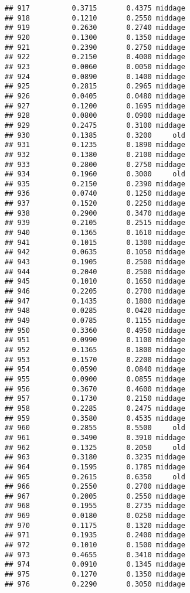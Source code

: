 \documentclass[
]{article}
\begin{document}
\begin{verbatim}
## 917          0.3715       0.4375 middage
## 918          0.1210       0.2550 middage
## 919          0.2630       0.2740 middage
## 920          0.1300       0.1350 middage
## 921          0.2390       0.2750 middage
## 922          0.2150       0.4000 middage
## 923          0.0060       0.0050 middage
## 924          0.0890       0.1400 middage
## 925          0.2815       0.2965 middage
## 926          0.0405       0.0480 middage
## 927          0.1200       0.1695 middage
## 928          0.0800       0.0900 middage
## 929          0.2475       0.3100 middage
## 930          0.1385       0.3200     old
## 931          0.1235       0.1890 middage
## 932          0.1380       0.2100 middage
## 933          0.2800       0.2750 middage
## 934          0.1960       0.3000     old
## 935          0.2150       0.2390 middage
## 936          0.0740       0.1250 middage
## 937          0.1520       0.2250 middage
## 938          0.2900       0.3470 middage
## 939          0.2105       0.2515 middage
## 940          0.1365       0.1610 middage
## 941          0.1015       0.1300 middage
## 942          0.0635       0.1050 middage
## 943          0.1905       0.2500 middage
## 944          0.2040       0.2500 middage
## 945          0.1010       0.1650 middage
## 946          0.2205       0.2700 middage
## 947          0.1435       0.1800 middage
## 948          0.0285       0.0420 middage
## 949          0.0785       0.1155 middage
## 950          0.3360       0.4950 middage
## 951          0.0990       0.1100 middage
## 952          0.1365       0.1800 middage
## 953          0.1570       0.2200 middage
## 954          0.0590       0.0840 middage
## 955          0.0900       0.0855 middage
## 956          0.3670       0.4600 middage
## 957          0.1730       0.2150 middage
## 958          0.2285       0.2475 middage
## 959          0.3580       0.4535 middage
## 960          0.2855       0.5500     old
## 961          0.3490       0.3910 middage
## 962          0.1325       0.2050     old
## 963          0.3180       0.3235 middage
## 964          0.1595       0.1785 middage
## 965          0.2615       0.6350     old
## 966          0.2550       0.2700 middage
## 967          0.2005       0.2550 middage
## 968          0.1955       0.2735 middage
## 969          0.0180       0.0250 middage
## 970          0.1175       0.1320 middage
## 971          0.1935       0.2400 middage
## 972          0.1010       0.1500 middage
## 973          0.4655       0.3410 middage
## 974          0.0910       0.1345 middage
## 975          0.1270       0.1350 middage
## 976          0.2290       0.3050 middage

\end{verbatim}
\end{document}
